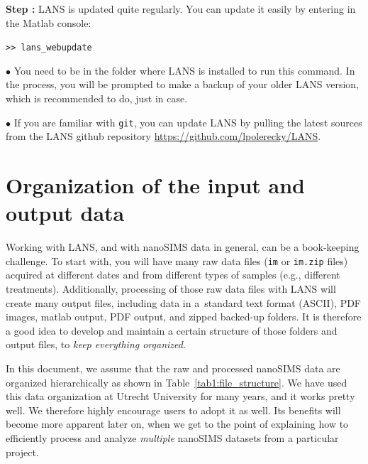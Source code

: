 \documentclass[a4paper, 11pt]{article}
\newcommand{\ttt}[1]{\texttt{#1}}
\newcounter{step}
\newcommand\s{\addtocounter{step}{1}\vskip5pt\noindent\textbf{Step \thestep:}{ }}
\newcommand\bul{\vskip5pt\noindent$\bullet${ }}
\begin{document}
\s LANS is updated quite regularly. You can update it easily by entering in the Matlab console:

\ttt{>> lans\_webupdate} 

\bul You need to be in the folder where LANS is installed to run this command. In the process, you will be prompted to make a backup of your older LANS version, which is recommended to do, just in case.

\bul If you are familiar with \ttt{git}, you can update LANS by pulling the latest sources from the LANS github repository \url{https://github.com/lpolerecky/LANS}.


\section{Organization of the input and output data}
\label{sec:data_organization}

Working with LANS, and with nanoSIMS data in general, can be a book-keeping challenge. To start with, you will have many raw data files (\ttt{im} or \ttt{im.zip} files) acquired at different dates and from different types of samples (e.g., different treatments). Additionally, processing of those raw data files with LANS will create many output files, including data in a~standard text format (ASCII), PDF images, matlab output, PDF output, and zipped backed-up folders. It is therefore a good idea to develop and maintain a certain structure of those folders and output files, to \emph{keep everything organized}. 

In this document, we assume that the raw and processed nanoSIMS data are organized hierarchically as shown in Table~\ref{tab1:file_structure}. We have used this data organization at Utrecht University for many years, and it works pretty well. We therefore highly encourage users to adopt it as well. Its benefits will become more apparent later on, when we get to the point of explaining how to efficiently process and analyze \emph{multiple} nanoSIMS datasets from a particular project.
\end{document}
